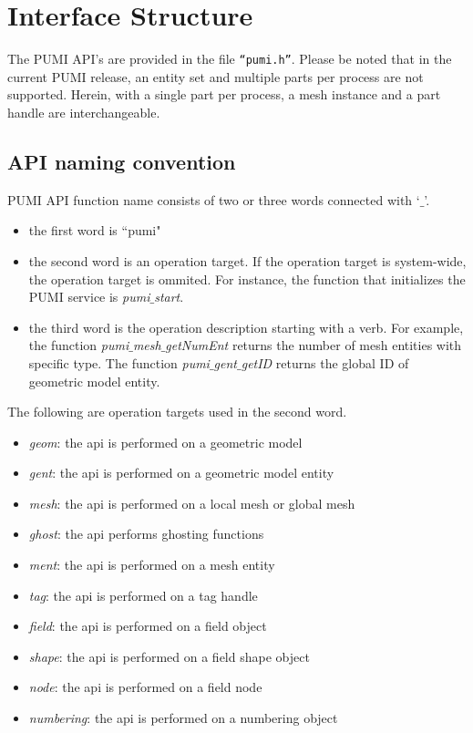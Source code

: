 \section{Interface Structure}

The PUMI API's are provided in the file \texttt{``pumi.h''}. Please be noted that in the current PUMI release, an entity set and multiple parts per process are not supported. Herein, with a single part per process, a mesh instance and a part handle are interchangeable.

\subsection{API naming convention}

PUMI API function name consists of two or three words connected with `$\_$'.

\begin{itemize}
\item the first word is ``pumi"
\item the second word is an operation target. If the operation target is system-wide, the operation target is ommited. For instance, the function that initializes the PUMI service is \emph{pumi}$\_$\emph{start}.
\item the third word is the operation description starting with a verb. For example, the function \emph{pumi}$\_$\emph{mesh}$\_$\emph{getNumEnt} returns the number of mesh entities with specific type. The function \emph{pumi}$\_$\emph{gent}$\_$\emph{getID} returns the global ID of geometric model entity.
\end{itemize}

The following are operation targets used in the second word.

\begin{itemize}
\item \textit{geom}: the api is performed on a geometric model
\item \textit{gent}: the api is performed on a geometric model entity
\item \textit{mesh}: the api is performed on a local mesh or global mesh
\item \textit{ghost}: the api performs ghosting functions
\item \textit{ment}: the api is performed on a mesh entity
\item \textit{tag}: the api is performed on a tag handle
\item \textit{field}: the api is performed on a field object
\item \textit{shape}: the api is performed on a field shape object
\item \textit{node}: the api is performed on a field node
\item \textit{numbering}: the api is performed on a numbering object
\end{itemize}

